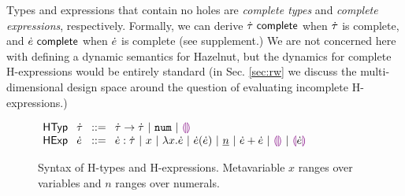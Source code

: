 Types and expressions that contain no holes are \emph{complete types} and \emph{complete expressions}, respectively. Formally, we can derive $\dot{\tau}~\mathsf{complete}$ when $\dot{\tau}$ is complete, and $\dot{e}~\mathsf{complete}$ when $\dot{e}$ is complete (see supplement.) We are not concerned here with defining a dynamic semantics for Hazelnut, but the dynamics for complete H-expressions would be entirely standard (in Sec. \ref{sec:rw} we discuss the multi-dimensional design space around the question of evaluating incomplete H-expressions.)%

\begin{figure}[t]
$\arraycolsep=4pt\begin{array}{lllllll}
\mathsf{HTyp} & \htau & ::= &
  \tarr{\htau}{\htau} ~\vert~
  \tnum ~\vert~
  \tehole\\
\mathsf{HExp} & \hexp & ::= &
  \hexp : \htau ~\vert~
  x ~\vert~
  \hlam{x}{\hexp} ~\vert~
  \hap{\hexp}{\hexp} ~\vert~
  \hnum{n} ~\vert~
  \hadd{\hexp}{\hexp} ~\vert~
  \hehole ~\vert~
  \hhole{\hexp}
\end{array}$
\caption{Syntax of H-types and H-expressions. Metavariable $x$ ranges over variables and $n$ ranges over numerals.}
\label{fig:hexp-syntax}
\end{figure}
